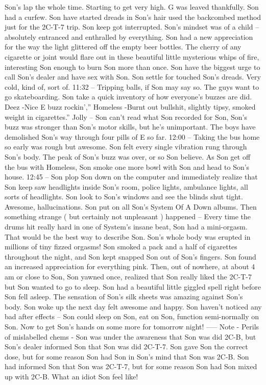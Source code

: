 \documentclass[12pt]{book}
\begin{document}
Son's lap the whole time. Starting to get very high. G was leaved thankfully. Son had a curfew. Son have started dreads in Son's hair used the backcombed method just for the 2C-T-7 trip. Son keep got interrupted. Son's mindset was of a child -- absolutely entranced and enthralled by everything. Son had a new appreciation for the way the light glittered off the empty beer bottles. The cherry of any cigarette or joint would flare out in these beautiful little mysterious whips of fire, interesting Son enough to burn Son more than once. Son have the biggest urge to call Son's dealer and have sex with Son. Son settle for touched Son's dreads. Very cold, kind of, sort of. 11:32 -- Tripping balls, if Son may say so. The guys want to go skateboarding. Son take a quick inventory of how everyone's buzzes are did.  Deez -Nice E buzz rockin',''  Homeless -Burnt out bullshit, slightly tipsy, smoked weight in cigarettes.''  Jolly -- Son can't read what Son recorded for Son, Son's buzz was stronger than Son's motor skills, but he's unimportant. The boys have demolished Son's way through four pills of E so far. 12:00 -- Taking the bus home so early was rough but awesome. Son felt every single vibration rung through Son's body. The peak of Son's buzz was over, or so Son believe. As Son get off the bus with Homeless, Son smoke one more bowl with Son and head to Son's house. 12:45 -- Son plop Son down on the computer and immediately realize that Son keep saw headlights inside Son's room, police lights, ambulance lights, all sorts of headlights. Son look to Son's windows and see the blinds shut tight. Awesome, hallucinations. Son put on all Son's System Of A Down albums. Then something strange ( but certainly not unpleasant ) happened -- Every time the drums hit really hard in one of System's insane beat, Son had a mini-orgasm. That would be the best way to describe Son. Son's whole body was erupted in millions of tiny fizzed orgasms! Son smoked a pack and a half of cigarettes throughout the night, and Son kept snapped Son out of Son's fingers. Son found an increased appreciation for everything pink. Then, out of nowhere, at about 4 am or close to Son, Son yawned once, realized that Son really liked the 2C-T-7 but Son wanted to go to sleep. Son had a beautiful little giggled spell right before Son fell asleep. The sensation of Son's silk sheets was amazing against Son's body. Son woke up the next day felt awesome and happy. Son haven't noticed any bad after effects -- Son could sleep on Son, eat on Son, function semi-normally on Son. Now to get Son's hands on some more for tomorrow night! ----- Note - Perils of mislabelled chems - Son was under the awareness that Son was did 2C-B, but Son's dealer informed Son that Son was did 2C-T-7. Son gave Son the correct dose, but for some reason Son had Son in Son's mind that Son was 2C-B. Son had informed Son that Son was 2C-T-7, but for some reason Son had Son mixed up with 2C-B. What an idiot Son feel like!
\end{document}
